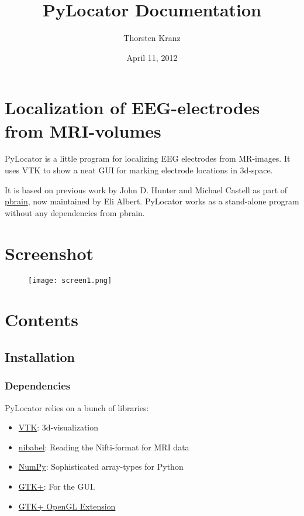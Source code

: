 \documentclass[letterpaper,10pt,english]{sphinxmanual}
\title{PyLocator Documentation}
\date{April 11, 2012}
\author{Thorsten Kranz}
\begin{document}
\maketitle
\tableofcontents
{}\label{index::doc}



\chapter{Localization of EEG-electrodes from MRI-volumes}
\label{index:pylocator}\label{index:localization-of-eeg-electrodes-from-mri-volumes}
PyLocator is a little program for localizing EEG electrodes from MR-images.
It uses VTK to show a neat GUI for marking electrode locations in 3d-space.

It is based on previous work by John D. Hunter and Michael Castell as
part of \href{https://github.com/nipy/pbrain}{pbrain}, now maintained by Eli
Albert. PyLocator works as a stand-alone program without any dependencies
from pbrain.


\chapter{Screenshot}
\label{index:screenshot}\begin{figure}[htbp]
\centering

\texttt{[image: screen1.png]}
\end{figure}


\chapter{Contents}
\label{index:contents}

\section{Installation}
\label{install:installation}\label{install::doc}

\subsection{Dependencies}
\label{install:dependencies}
PyLocator relies on a bunch of libraries:
\begin{itemize}
\item {} 
\href{http://www.vtk.org}{VTK}: 3d-visualization

\item {} 
\href{http://nipy.sourceforge.net/nibabel/}{nibabel}: Reading the Nifti-format for MRI data

\item {} 
\href{http://www.scipy.org}{NumPy}: Sophisticated array-types for Python

\item {} 
\href{http://www.pygtk.org/}{GTK+}: For the GUI.

\item {} 
\href{http://projects.gnome.org/gtkglext/}{GTK+ OpenGL Extension}

\end{itemize}
\end{document}

